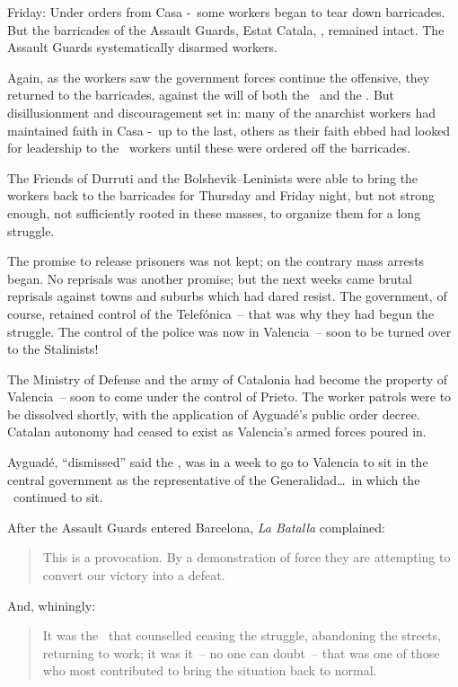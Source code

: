Friday: Under orders from Casa \CNT-\FAI\ some workers began to tear down barricades. But the barricades of the Assault Guards, Estat Catala, \PSUC\kn, remained intact. The Assault Guards systematically disarmed workers.

Again, as the workers saw the government forces continue the offensive, they returned to the barricades, against the will of both the \CNT\ and the \POUM\kn. But disillusionment and discouragement set in: many of the anarchist workers had maintained faith in Casa \CNT-\FAI\ up to the last, others as their faith ebbed had looked for leadership to the \POUM\ workers until these were ordered off the barricades.

The Friends of Durruti and the Bolshevik--Leninists were able to bring the workers back to the barricades for Thursday and Friday night, but not strong enough, not sufficiently rooted in these masses, to organize them for a long struggle.

The promise to release prisoners was not kept; on the contrary mass arrests began. No reprisals was another promise; but the next weeks came brutal reprisals against towns and suburbs which had dared resist. The government, of course, retained control of the Telef\'onica~-- that was why they had begun the struggle. The control of the police was now in Valencia~-- soon to be turned over to the Stalinists!

The Ministry of Defense and the army of Catalonia had become the property of \kp\kp Valencia~-- soon to come under the control of Prieto. The worker patrols were to be dissolved shortly, with the application of Ayguad\'e’s public order decree. Catalan autonomy had ceased to exist as Valencia’s armed forces poured in.

Ayguad\'e, ``dismissed'' said the \CNT\kn, was in a week to go to Valencia to sit in the central government as the representative of the Generalidad\dots\ in which the \CNT\ continued to sit.

\smallskip

After the Assault Guards entered Barcelona, \emph{La Batalla} complained:

\begin{quotation}
  This is a provocation. By a demonstration of force they are attempting to convert our victory into a defeat.
\end{quotation}

And, whiningly:

\begin{quotation}
  It was the \POUM\ that counselled ceasing the struggle, abandoning the streets, returning to work; it was it~-- no one can doubt~-- that was one of those who most contributed to bring the situation back to normal.
\end{quotation}

